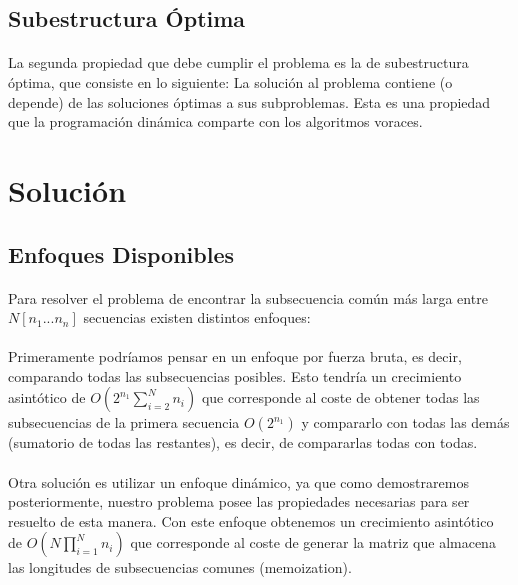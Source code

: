 \documentclass{article}
\begin{document}
	\subsection{Subestructura Óptima}
	
		\paragraph{}
		La segunda propiedad que debe cumplir el problema es la de subestructura óptima, que consiste en lo siguiente: La solución al problema contiene (o depende) de las soluciones óptimas a sus subproblemas. Esta es una propiedad que la programación dinámica comparte con los algoritmos voraces.

\section{Solución}

	\subsection{Enfoques Disponibles}
	
		\paragraph{}
		Para resolver el problema de encontrar la subsecuencia común más larga entre $N[n_{1}...n_{n}]$ secuencias existen distintos enfoques:

		\paragraph{}
		 Primeramente podríamos pensar en un enfoque por fuerza bruta, es decir, comparando todas las subsecuencias posibles. Esto tendría un crecimiento asintótico de $O(2^{n_{1}}\sum_{i = 2}^{N}n_{i})$ que corresponde al coste de obtener todas las subsecuencias de la primera secuencia $O(2^{n_{1}})$ y compararlo con todas las demás  (sumatorio de todas las restantes), es decir, de compararlas todas con todas.

		\paragraph{}
		 Otra solución es utilizar un enfoque dinámico, ya que como demostraremos posteriormente, nuestro problema posee las propiedades necesarias para ser resuelto de esta manera. Con este enfoque obtenemos un crecimiento asintótico de  $O(N\prod_{i = 1}^{N}n_{i})$ que corresponde al coste de generar la matriz que almacena las longitudes de subsecuencias comunes (memoization).
\end{document}
